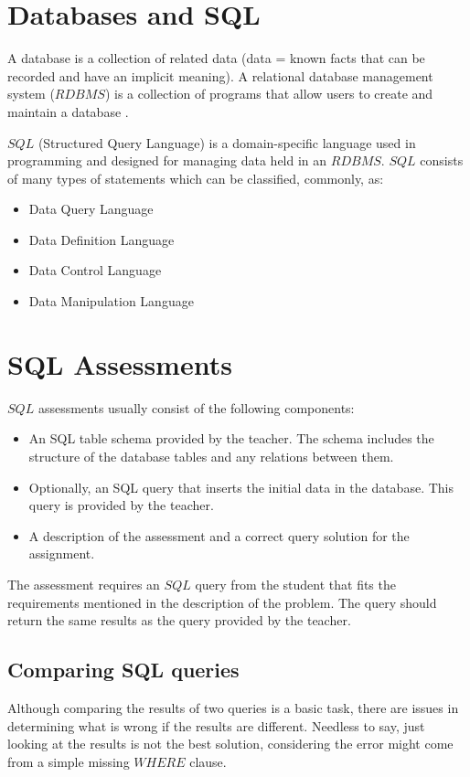\section{Databases and SQL}
A database is a collection of related data (data = known facts that can be
recorded and have an implicit meaning). A relational database management system ($RDBMS$) is a collection of programs
that allow users to create and maintain a database \cite{sql_course}.

$SQL$ (Structured Query Language) is a domain-specific language used in programming
and designed for managing data held in an $RDBMS$.
$SQL$ consists of many types of statements which can be classified, commonly, as: \cite{wiki:sql}
\begin{itemize}
    \item Data Query Language
    \item Data Definition Language
    \item Data Control Language
    \item Data Manipulation Language
\end{itemize}


\section{SQL Assessments}
$SQL$ assessments usually consist of the following components:

\begin{itemize}
    \item An SQL table schema provided by the teacher. The schema includes
    the structure of the database tables and any relations between them.
    \item Optionally, an SQL query that inserts the initial data in the database.
    This query is provided by the teacher.
    \item A description of the assessment and a correct query solution for the
    assignment.
\end{itemize}

The assessment requires an $SQL$ query from the student that fits the requirements
mentioned in the description of the problem. The query should return the same
results as the query provided by the teacher.

\subsection{Comparing SQL queries}
Although comparing the results of two queries is a basic task, there are issues
in determining what is wrong if the results are different. Needless to say, just
looking at the results is not the best solution, considering the error might come
from a simple missing $WHERE$ clause.


